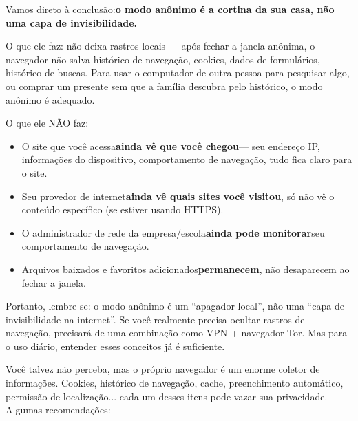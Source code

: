 
Vamos direto à conclusão:\textbf{o modo anônimo é a cortina da sua casa, não uma capa de invisibilidade.}

O que ele faz: não deixa rastros locais — após fechar a janela anônima, o navegador não salva histórico de navegação, cookies, dados de formulários, histórico de buscas. Para usar o computador de outra pessoa para pesquisar algo, ou comprar um presente sem que a família descubra pelo histórico, o modo anônimo é adequado.

O que ele NÃO faz:

\begin{itemize}
  \item O site que você acessa\textbf{ainda vê que você chegou}— seu endereço IP, informações do dispositivo, comportamento de navegação, tudo fica claro para o site.
  \item Seu provedor de internet\textbf{ainda vê quais sites você visitou}, só não vê o conteúdo específico (se estiver usando HTTPS).
  \item O administrador de rede da empresa/escola\textbf{ainda pode monitorar}seu comportamento de navegação.
  \item Arquivos baixados e favoritos adicionados\textbf{permanecem}, não desaparecem ao fechar a janela.
\end{itemize}

Portanto, lembre-se: o modo anônimo é um “apagador local”, não uma “capa de invisibilidade na internet”. Se você realmente precisa ocultar rastros de navegação, precisará de uma combinação como VPN + navegador Tor. Mas para o uso diário, entender esses conceitos já é suficiente.


Você talvez não perceba, mas o próprio navegador é um enorme coletor de informações. Cookies, histórico de navegação, cache, preenchimento automático, permissão de localização... cada um desses itens pode vazar sua privacidade. Algumas recomendações:

